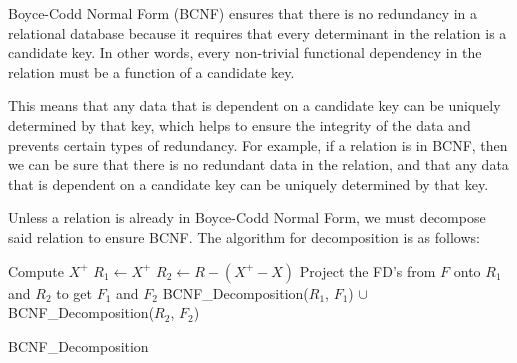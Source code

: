 \documentclass{report}
\begin{document}
        \vspace{.5cm}
         

        Boyce-Codd Normal Form (BCNF) ensures that there is no redundancy in a relational database because it requires that every determinant in the relation is a candidate key. In other words, every non-trivial functional dependency in the relation must be a function of a candidate key.

This means that any data that is dependent on a candidate key can be uniquely determined by that key, which helps to ensure the integrity of the data and prevents certain types of redundancy. For example, if a relation is in BCNF, then we can be sure that there is no redundant data in the relation, and that any data that is dependent on a candidate key can be uniquely determined by that key.

        Unless a relation is already in Boyce-Codd Normal Form, we must decompose said relation to ensure BCNF. The algorithm for decomposition is as follows:
        \vspace{.5cm}
         

        \begin{algorithm}[H]
            \vspace{.2cm}
            \SetAlgoLined
            \SetNoFillComment
             {
                Compute $X^+$\;
                $R_1 \leftarrow X^+$ \;
                $R_2 \leftarrow R-(X^+-X)$ \;
                Project the FD's from $F$ onto $R_1$ and $R_2$ to get $F_1$ and $F_2$ \;
                \Return BCNF\_Decomposition($R_1$, $F_1$) $\cup$ BCNF\_Decomposition($R_2$, $F_2$)\; 
            }
            
            \caption{BCNF\_Decomposition}
        \end{algorithm}
        \vspace{.5cm}
         
\end{document}
